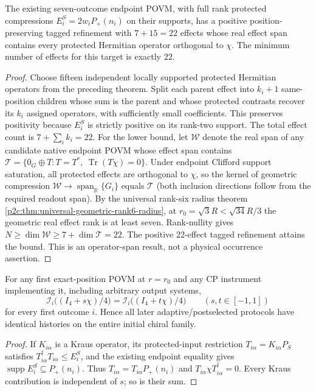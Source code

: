 \documentclass[12pt,a4paper]{article}
\begin{document}
\begin{corollary}
\label{p2c:cor:v354-protected-22}
The existing seven-outcome endpoint POVM, with full rank protected
compressions $E_i^S=2w_iP_+(n_i)$ on their supports, has a positive
position-preserving tagged refinement with $7+15=22$ effects whose
real effect span contains every protected Hermitian operator orthogonal
to $\chi$. The minimum number of effects for this target is exactly $22$.
\end{corollary}
\begin{proof}
Choose fifteen independent locally supported protected Hermitian
operators from the preceding theorem. Split each parent effect into
$k_i+1$ same-position children whose sum is the parent and whose
protected contrasts recover its $k_i$ assigned operators, with
sufficiently small coefficients. This preserves positivity because
$E_i^S$ is strictly positive on its rank-two support.
The total effect count is $7+\sum_i k_i=22$.
For the lower bound, let $\mathcal W$ denote the real span of any
candidate native endpoint POVM whose effect span contains
$\mathcal T=\{0_G\oplus T:T=T^*,\ \operatorname{Tr}(T\chi)=0\}$.
Under endpoint Clifford support saturation, all protected effects
are orthogonal to $\chi$, so the kernel of geometric compression
$\mathcal W\to\operatorname{span}_{\mathbb R}\{G_i\}$ equals
$\mathcal T$ (both inclusion directions follow from the required
readout span). By the universal rank-six radius theorem
\ref{p2c:thm:universal-geometric-rank6-radius}, at
$r_0=\sqrt3R<\sqrt{34}R/3$ the geometric real effect rank is
at least seven. Rank-nullity gives
$N\ge\dim\mathcal W\ge7+\dim\mathcal T=22$.
The positive 22-effect tagged refinement attains the bound.
This is an operator-span result, not a physical occurrence assertion.
\end{proof}

\begin{theorem}
\label{p2c:thm:v354-chiral-instrument-erasure}
For any first exact-position POVM at $r=r_0$ and any CP instrument
implementing it, including arbitrary output systems,
\[
\mathcal I_i\bigl((I_4+s\chi)/4\bigr)
=\mathcal I_i\bigl((I_4+t\chi)/4\bigr)
\qquad(s,t\in[-1,1])
\]
for every first outcome $i$. Hence all later adaptive/postselected
protocols have identical histories on the entire initial chiral family.
\end{theorem}
\begin{proof}
If $K_{i\alpha}$ is a Kraus operator, its protected-input restriction
$T_{i\alpha}=K_{i\alpha}P_S$ satisfies
$T_{i\alpha}^\dagger T_{i\alpha}\le E_i^S$, and the existing
endpoint equality gives $\operatorname{supp}E_i^S\subseteq P_+(n_i)$.
Thus $T_{i\alpha}=T_{i\alpha}P_+(n_i)$ and
$T_{i\alpha}\chi T_{i\alpha}^\dagger=0$.
Every Kraus contribution is independent of $s$; so is their sum.
\end{proof}
\end{document}
